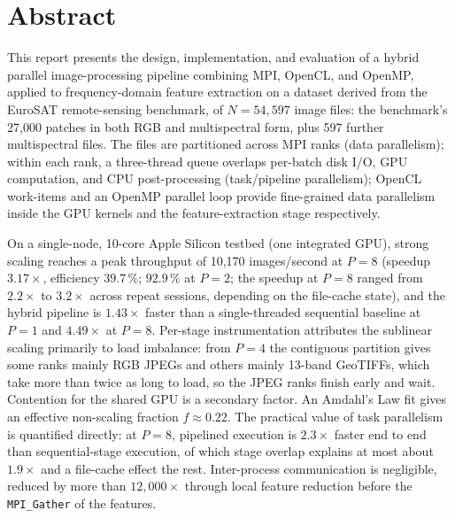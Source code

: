 \documentclass[a4paper,12pt]{report}
\begin{document}
\chapter*{Abstract}

This report presents the design, implementation, and evaluation of a
hybrid parallel image-processing pipeline combining MPI, OpenCL, and
OpenMP, applied to frequency-domain feature extraction on a dataset
derived from the EuroSAT remote-sensing benchmark, of $N=54{,}597$ image files: the
benchmark's 27{,}000 patches in both RGB and multispectral form, plus 597
further multispectral files. The files are
partitioned across MPI ranks (data parallelism); within each rank, a
three-thread queue overlaps per-batch disk I/O, GPU computation, and
CPU post-processing (task/pipeline parallelism); OpenCL work-items and
an OpenMP parallel loop provide fine-grained data parallelism inside the
GPU kernels and the feature-extraction stage respectively.

On a single-node, 10-core Apple Silicon testbed (one integrated GPU),
strong scaling reaches a peak throughput of 10{,}170 images/second at
$P=8$ (speedup $3.17\times$, efficiency $39.7\,\%$; $92.9\,\%$ at
$P=2$; the speedup at $P=8$ ranged from $2.2\times$ to $3.2\times$ across repeat
sessions, depending on the file-cache state), and the hybrid pipeline is $1.43\times$ faster than a
single-threaded sequential baseline at $P=1$ and $4.49\times$ at $P=8$.
Per-stage instrumentation attributes the sublinear scaling primarily to
load imbalance: from $P=4$ the contiguous partition gives some ranks
mainly RGB JPEGs and others mainly 13-band GeoTIFFs, which take more
than twice as long to load, so the JPEG ranks finish early and wait.
Contention for the shared GPU is a secondary factor. An Amdahl's Law
fit gives an effective non-scaling fraction $f\approx0.22$. The
practical value of task parallelism is quantified directly: at $P=8$,
pipelined execution is $2.3\times$ faster end to end than
sequential-stage execution, of which stage overlap explains at most about
$1.9\times$ and a file-cache effect the rest. Inter-process communication is
negligible, reduced
by more than $12{,}000\times$ through local feature reduction before the
\texttt{MPI\_Gather} of the features.

\clearpage

\begin{singlespace}
\tableofcontents
\end{singlespace}
\clearpage
\end{document}
